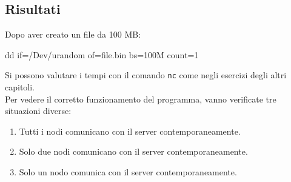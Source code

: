 \newpage
\subsection{Risultati}
Dopo aver creato un file da 100 MB:
\begin{bash}
dd if=/Dev/urandom of=file.bin bs=100M count=1
\end{bash}
Si possono valutare i tempi con il comando \texttt{nc} come negli esercizi degli altri capitoli. \\
Per vedere il corretto funzionamento del programma, vanno verificate tre situazioni diverse:
\begin{enumerate}
  \item Tutti i nodi comunicano con il server contemporaneamente.
  \item Solo due nodi comunicano con il server contemporaneamente.
  \item Solo un nodo comunica con il server contemporaneamente.
\end{enumerate}

